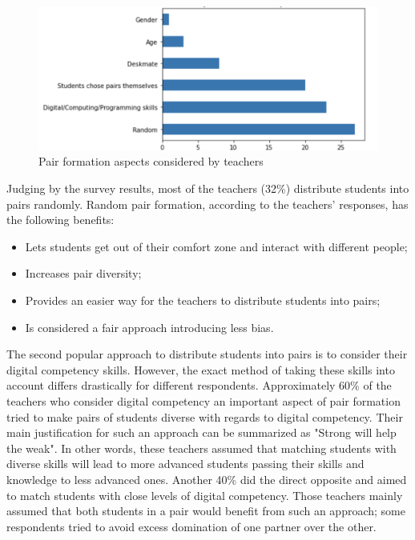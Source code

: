 \documentclass[conference]{IEEEtran}
\begin{document}
\begin{figure}[h]
\includegraphics[scale=0.42]{aspects-pair-formation.png}
\caption{Pair formation aspects considered by teachers}
\label{fig:aspectsPairFormation}
\end{figure}

Judging by the survey results, most of the teachers (32\%) distribute students into pairs randomly. Random pair formation, according to the teachers' responses, has the following benefits:

\begin{itemize}
    \item Lets students get out of their comfort zone and interact with different people;
    \item Increases pair diversity;
    \item Provides an easier way for the teachers to distribute students into pairs;
    \item Is considered a fair approach introducing less bias.
\end {itemize}

The second popular approach to distribute students into pairs is to consider their digital competency skills. However, the exact method of taking these skills into account differs drastically for different respondents. Approximately 60\% of the teachers who consider digital competency an important aspect of pair formation tried to make pairs of students diverse with regards to digital competency. Their main justification for such an approach can be summarized as "Strong will help the weak". In other words, these teachers assumed that matching students with diverse skills will lead to more advanced students passing their skills and knowledge to less advanced ones. Another 40\% did the direct opposite and aimed to match students with close levels of digital competency. Those teachers mainly assumed that both students in a pair would benefit from such an approach; some respondents tried to avoid excess domination of one partner over the other.
\end{document}
